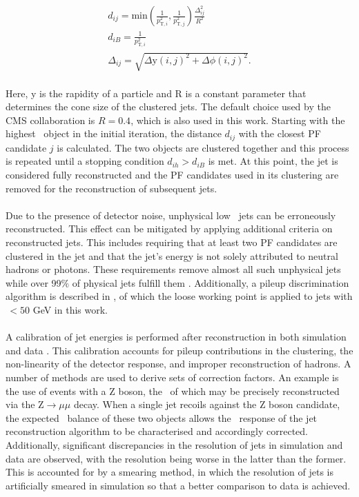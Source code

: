 \begin{gather}
    d_{ij} = \mathrm{min}(\frac{1}{p^2_{\mathrm{T}, i}}, \frac{1}{p^2_{\mathrm{T}, j}})\frac{\Delta_{ij}^2}{R^2} \\
    d_{iB} = \frac{1}{p^2_{\mathrm{T}, i}} \\
    \Delta_{ij} = \sqrt{\Delta\mathrm{y}(i,j)^2 + \Delta\phi(i,j)^2}. 
\end{gather}
\\
Here, y is the rapidity of a particle and R is a constant parameter that determines the cone size of the clustered jets. The default choice used by the CMS collaboration is $R=0.4$, which is also used in this work. Starting with the highest \pt \, object in the initial iteration, the distance $d_{ij}$ with the closest PF candidate $j$ is calculated. The two objects are clustered together and this process is repeated until a stopping condition $d_{ih} > d_{iB}$ is met. At this point, the jet is considered fully reconstructed and the PF candidates used in its clustering are removed for the reconstruction of subsequent jets. \\
\\
Due to the presence of detector noise, unphysical low \pt \, jets can be erroneously reconstructed. This effect can be mitigated by applying additional criteria on reconstructed jets. This includes requiring that at least two PF candidates are clustered in the jet and that the jet's energy is not solely attributed to neutral hadrons or photons. These requirements remove almost all such unphysical jets while over 99$\%$ of physical jets fulfill them \cite{CMSJetPerformance}. Additionally, a pileup discrimination algorithm is described in \cite{CMSJetPerformance}, of which the loose working point is applied to jets with \pt\,$<50$ GeV in this work. \\
\\
A calibration of jet energies is performed after reconstruction in both simulation and data \cite{CMSJEC}. This calibration accounts for pileup contributions in the clustering, the non-linearity of the detector response, and improper reconstruction of hadrons. A number of methods are used to derive sets of correction factors. An example is the use of events with a Z boson, the \pt \, of which may be precisely reconstructed via the Z$\rightarrow\mu\mu$ decay. When a single jet recoils against the Z boson candidate, the expected \pt \, balance of these two objects allows the \pt \, response of the jet reconstruction algorithm to be characterised and accordingly corrected. Additionally, significant discrepancies in the resolution of jets in simulation and data are observed, with the resolution being worse in the latter than the former. This is accounted for by a smearing method, in which the resolution of jets is artificially smeared in simulation so that a better comparison to data is achieved. 

